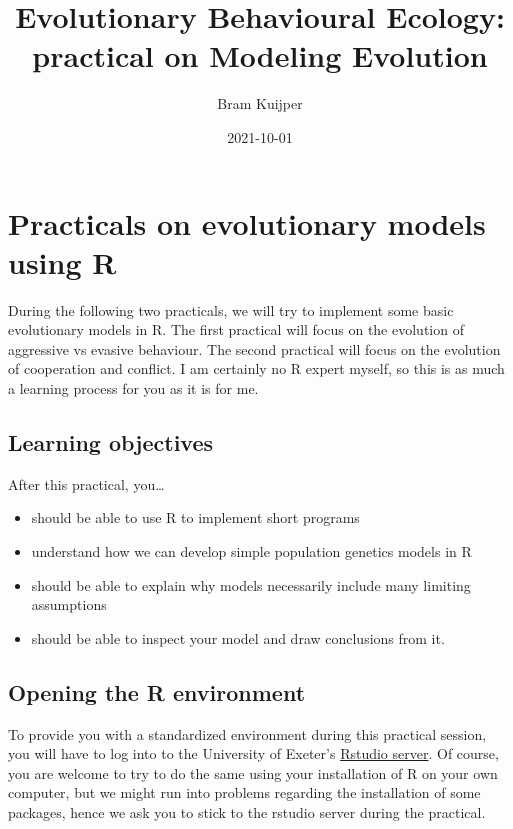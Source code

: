 \documentclass[
]{book}
\title{Evolutionary Behavioural Ecology: practical on Modeling Evolution}
\author{Bram Kuijper}
\date{2021-10-01}
\providecommand{\tightlist}{%
  \setlength{\itemsep}{0pt}\setlength{\parskip}{0pt}}
\begin{document}
\maketitle

{
\setcounter{tocdepth}{1}
\tableofcontents
}
\hypertarget{practicals-on-evolutionary-models-using-r}{%
\chapter{Practicals on evolutionary models using R}\label{practicals-on-evolutionary-models-using-r}}

During the following two practicals, we will try to implement some basic evolutionary models in R. The first practical will focus on the evolution of aggressive vs evasive behaviour. The second practical will focus on the evolution of cooperation and conflict. I am certainly no R expert myself, so this is as much a learning process for you as it is for me.

\hypertarget{learning-objectives}{%
\section{Learning objectives}\label{learning-objectives}}

After this practical, you\ldots{}

\begin{itemize}
\tightlist
\item
  should be able to use R to implement short programs
\item
  understand how we can develop simple population genetics models in R
\item
  should be able to explain why models necessarily include many limiting assumptions
\item
  should be able to inspect your model and draw conclusions from it.
\end{itemize}

\hypertarget{opening-the-r-environment}{%
\section{Opening the R environment}\label{opening-the-r-environment}}

To provide you with a standardized environment during this practical session, you will have to log into to the University of Exeter's \href{https://rstudio01.cles.ex.ac.uk}{Rstudio server}. Of course, you are welcome to try to do the same using your installation of R on your own computer, but we might run into problems regarding the installation of some packages, hence we ask you to stick to the rstudio server during the practical.
\end{document}

